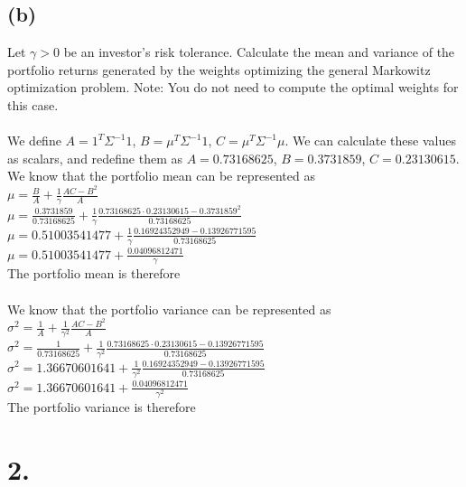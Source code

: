 \documentclass{article}
\begin{document}
{\subsection*{(b)}

Let $\gamma > 0$ be an investor’s risk tolerance. Calculate the mean and variance of the portfolio returns generated by the weights optimizing the general Markowitz optimization problem. Note: You do not need to compute the optimal weights for this case. \\ \\

We define $A = 1^T \Sigma^{-1} 1$, $B = \mu^T \Sigma^{-1} 1$, $C = \mu^T \Sigma^{-1} \mu$. We can calculate these values as scalars, and redefine them as $A = 0.73168625$, $B = 0.3731859$, $C = 0.23130615$.
We know that the portfolio mean can be represented as \\
$\mu = \frac{B}{A} + \frac{1}{\gamma} \frac{AC - B^2}{A}$ \\
$\mu = \frac{0.3731859}{0.73168625} + \frac{1}{\gamma} \frac{0.73168625 \cdot 0.23130615 - 0.3731859^2}{0.73168625}$ \\
$\mu = 0.51003541477 + \frac{1}{\gamma} \frac{0.16924352949 - 0.13926771595}{0.73168625}$ \\
$\mu = 0.51003541477 + \frac{0.04096812471}{\gamma}$ \\
The portfolio mean is therefore  \\ \\
We know that the portfolio variance can be represented as \\
$\sigma^2 = \frac{1}{A} + \frac{1}{\gamma^2} \frac{AC - B^2}{A}$ \\
$\sigma^2 = \frac{1}{0.73168625} + \frac{1}{\gamma^2} \frac{0.73168625 \cdot 0.23130615 - 0.13926771595}{0.73168625}$ \\
$\sigma^2 = 1.36670601641 + \frac{1}{\gamma^2} \frac{0.16924352949 - 0.13926771595}{0.73168625}$ \\
$\sigma^2 = 1.36670601641 + \frac{0.04096812471}{\gamma^2}$ \\
The portfolio variance is therefore 

}

\section*{2.}
\end{document}
